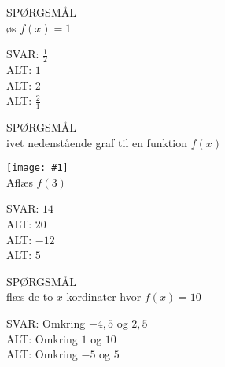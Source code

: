 \documentclass[]{article}
\newcounter{spgcounter}
\newenvironment{question}[2]{\addtocounter{spgcounter}{1} SPØRGSMÅL \thespgcounter\\}{\hspace{50px}}
\newcommand{\image}[1]{\texttt{[image: \#1]}\\}
\newcommand{\answer}[1]{{\color{green} SVAR: #1}\\}
\newcommand{\alt}[1]{{\color{red} ALT: #1}\\}
\begin{document}
\begin{question}{multi}
    
Løs $f(x)=1$
        
\answer{$\frac{1}{2}$}
\alt{$1$}
\alt{$2$}
\alt{$\frac{2}{1}$}

\end{question}


\begin{question}{multi}
    
Givet nedenstående graf til en funktion $f(x)$

\image{andengradsfunktionen1.png}

Aflæs $f(3)$

\answer{$14$}
\alt{$20$}
\alt{$-12$}
\alt{$5$}

\end{question}

\begin{question}{multi}
    
Aflæs de to $x$-kordinater hvor $f(x)=10$
    
\answer{Omkring $-4,5$ og $2,5$}
\alt{Omkring $1$ og $10$}
\alt{Omkring $-5$ og $5$}

\end{question}
\end{document}
